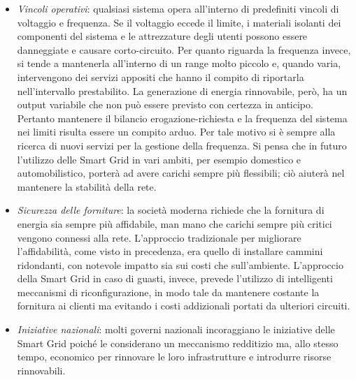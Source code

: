 \begin{itemize}
\item \textit{Vincoli operativi}: qualsiasi sistema opera all'interno di predefiniti vincoli di voltaggio e frequenza. Se il voltaggio eccede il limite, i materiali isolanti dei componenti del sistema e le attrezzature degli utenti possono essere danneggiate e causare corto-circuito. \newline Per quanto riguarda la frequenza invece, si tende a mantenerla all'interno di un range molto piccolo e, quando varia, intervengono dei servizi appositi che hanno il compito di riportarla nell'intervallo prestabilito. \newline
La generazione di energia rinnovabile, però, ha un output variabile che non può essere previsto con certezza in anticipo. Pertanto mantenere il bilancio erogazione-richiesta e la frequenza del sistema nei limiti risulta essere un compito arduo. Per tale motivo si è sempre alla ricerca di nuovi servizi per la gestione della frequenza. \newline Si pensa che in futuro l'utilizzo delle Smart Grid in vari ambiti, per esempio domestico e automobilistico, porterà ad avere carichi sempre più flessibili; ciò aiuterà nel mantenere la stabilità della rete.

\item \textit{Sicurezza delle forniture}: la società moderna richiede che la fornitura di energia sia sempre più affidabile, man mano che carichi sempre più critici vengono connessi alla rete. L'approccio tradizionale per migliorare l'affidabilità, come visto in precedenza, era quello di installare cammini ridondanti, con notevole impatto sia sui costi che sull'ambiente. \newline L'approccio della Smart Grid in caso di guasti, invece, prevede l'utilizzo di intelligenti meccanismi di riconfigurazione, in modo tale da mantenere costante la fornitura ai clienti ma evitando i costi addizionali portati da ulteriori circuiti.
\item \textit{Iniziative nazionali}: molti governi nazionali incoraggiano le iniziative delle Smart Grid poiché le considerano un meccanismo redditizio ma, allo stesso tempo, economico per rinnovare le loro infrastrutture e introdurre risorse rinnovabili.
\end{itemize}

